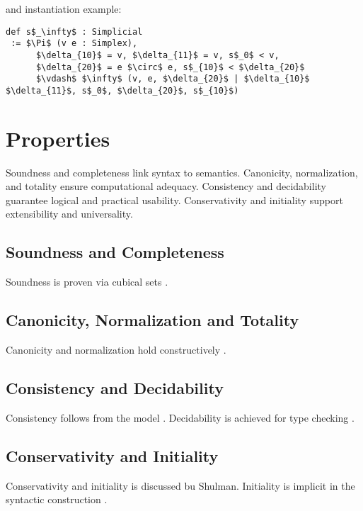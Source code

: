 \documentclass{article}
\theoremstyle{definition}
\begin{document}
and instantiation example:

\begin{lstlisting}[mathescape=true]
def s$_\infty$ : Simplicial
 := $\Pi$ (v e : Simplex),
      $\delta_{10}$ = v, $\delta_{11}$ = v, s$_0$ < v,
      $\delta_{20}$ = e $\circ$ e, s$_{10}$ < $\delta_{20}$
      $\vdash$ $\infty$ (v, e, $\delta_{20}$ | $\delta_{10}$ $\delta_{11}$, s$_0$, $\delta_{20}$, s$_{10}$)
\end{lstlisting}

\newpage
\section{Properties}

Soundness and completeness link syntax to semantics.
Canonicity, normalization, and totality ensure computational adequacy.
Consistency and decidability guarantee logical and practical usability.
Conservativity and initiality support extensibility and universality.

\subsection{Soundness and Completeness}

Soundness is proven via cubical sets \cite{CCHM, Awodey12, Coquand18}.

\subsection{Canonicity, Normalization and Totality}

Canonicity and normalization hold constructively \cite{Huber17, Streicher91}.

\subsection{Consistency and Decidability}

Consistency follows from the model \cite{Bezem14}.
Decidability is achieved for type checking \cite{Coquand18}.

\subsection{Conservativity and Initiality}

Conservativity and initiality is discussed bu Shulman\cite{Hofmann97, Shulman15}.
Initiality is implicit in the syntactic construction \cite{Awodey12}.
\end{document}
